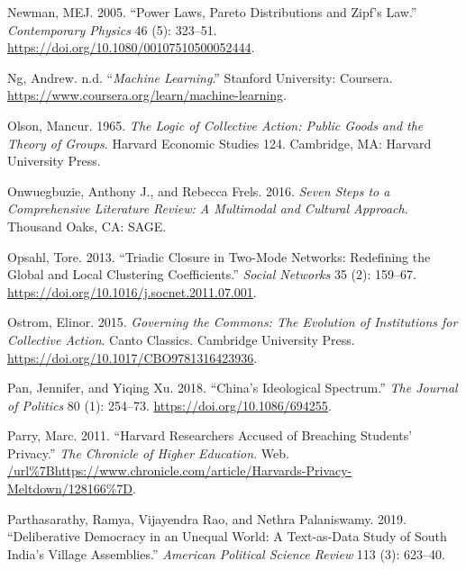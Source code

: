 \documentclass{book}
\newlength{\cslhangindent}
\newlength{\cslentryspacingunit} %
\newenvironment{CSLReferences}[2] %
 {%
  \setlength{\parindent}{0pt}
  \ifodd #1
  \let\oldpar\par
  \def\par{\hangindent=\cslhangindent\oldpar}
  \fi
  \setlength{\parskip}{#2\cslentryspacingunit}
 }%
 {}
\begin{document}
\begin{CSLReferences}{1}{0}
\leavevmode{}%
Newman, MEJ. 2005. {``Power Laws, Pareto Distributions and Zipf's Law.''}
\emph{Contemporary Physics} 46 (5): 323--51.
\url{https://doi.org/10.1080/00107510500052444}.

\leavevmode{}%
Ng, Andrew. n.d. {``\emph{Machine Learning}.''} Stanford University: Coursera.
\url{https://www.coursera.org/learn/machine-learning}.

\leavevmode{}%
Olson, Mancur. 1965. \emph{The Logic of Collective Action: Public Goods and
the Theory of Groups}. Harvard Economic Studies 124. {Cambridge, MA}: {Harvard
University Press}.

\leavevmode{}%
Onwuegbuzie, Anthony J., and Rebecca Frels. 2016. \emph{Seven {Steps} to a
{Comprehensive Literature Review}: {A Multimodal} and {Cultural Approach}}.
Thousand Oaks, CA: {SAGE}.

\leavevmode{}%
Opsahl, Tore. 2013. {``Triadic Closure in Two-Mode Networks: Redefining the
Global and Local Clustering Coefficients.''} \emph{Social Networks} 35 (2):
159--67. \url{https://doi.org/10.1016/j.socnet.2011.07.001}.

\leavevmode{}%
Ostrom, Elinor. 2015. \emph{Governing the Commons: The Evolution of
Institutions for Collective Action}. Canto Classics. Cambridge University
Press. \url{https://doi.org/10.1017/CBO9781316423936}.

\leavevmode{}%
Pan, Jennifer, and Yiqing Xu. 2018. {``China's {Ideological Spectrum}.''}
\emph{The Journal of Politics} 80 (1): 254--73.
\url{https://doi.org/10.1086/694255}.

\leavevmode{}%
Parry, Marc. 2011. {``Harvard Researchers Accused of Breaching Students'
Privacy.''} \emph{The Chronicle of Higher Education}. Web.
\url{/url\%7Bhttps://www.chronicle.com/article/Harvards-Privacy-Meltdown/128166\%7D}.

\leavevmode{}%
Parthasarathy, Ramya, Vijayendra Rao, and Nethra Palaniswamy. 2019.
{``Deliberative Democracy in an Unequal World: A Text-as-Data Study of South
India's Village Assemblies.''} \emph{\emph{American Political Science Review}}
113 (3): 623--40.


\end{CSLReferences}
\end{document}
